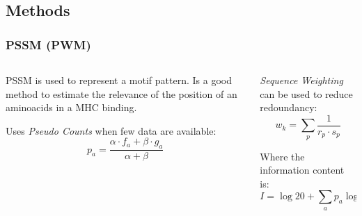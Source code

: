 \documentclass[presentation]{beamer}   %
\begin{document}
\subsection{Methods}
\begin{frame}
 \frametitle{PSSM (PWM)}
 \begin{columns}
  \begin{column}{5cm}
   \begin{block}\centering
    PSSM is used to represent a motif pattern.
    Is a good method to estimate the relevance 
    of the position of an aminoacids in a MHC binding. 
   \end{block}
   \pause
   \begin{block}\centering
   Uses \textit{Pseudo Counts} when few data are available:
    \begin{equation}
     p_a = \frac{\alpha \cdot f_a + \beta \cdot g_a}{\alpha + \beta}
    \end{equation}
   \end{block}
   \pause
  \end{column}
  \begin{column}{5cm}
   \begin{block}\centering
    \textit{Sequence Weighting} can be used to reduce redoundancy:
    \begin{equation}
     w_{k} = \sum_{p}{\frac{1}{r_p \cdot s_p}}
    \end{equation}

   \end{block}
   \pause
   \begin{block}\centering
    Where the information content is:
     \begin{equation}
     I = \log{ 20 } + \sum_{a}{ p_{a}\log{p_{a}} }
    \end{equation}
   \end{block}
  
  
  \end{column}
 \end{columns}

\end{frame}
\end{document}
